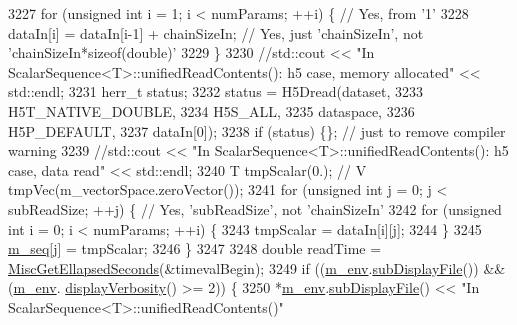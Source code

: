 \begin{DoxyCode}
3227               \textcolor{keywordflow}{for} (\textcolor{keywordtype}{unsigned} \textcolor{keywordtype}{int} i = 1; i < numParams; ++i) \{ \textcolor{comment}{// Yes, from '1'}
3228                 dataIn[i] = dataIn[i-1] + chainSizeIn; \textcolor{comment}{// Yes, just 'chainSizeIn', not
       'chainSizeIn*sizeof(double)'}
3229               \}
3230               \textcolor{comment}{//std::cout << "In ScalarSequence<T>::unifiedReadContents(): h5 case, memory allocated" <<
       std::endl;}
3231               herr\_t status;
3232               status = H5Dread(dataset,
3233                                H5T\_NATIVE\_DOUBLE,
3234                                H5S\_ALL,
3235                                dataspace,
3236                                H5P\_DEFAULT,
3237                                dataIn[0]);
3238               \textcolor{keywordflow}{if} (status) \{\}; \textcolor{comment}{// just to remove compiler warning}
3239               \textcolor{comment}{//std::cout << "In ScalarSequence<T>::unifiedReadContents(): h5 case, data read" <<
       std::endl;}
3240               T tmpScalar(0.); \textcolor{comment}{// V tmpVec(m\_vectorSpace.zeroVector());}
3241               \textcolor{keywordflow}{for} (\textcolor{keywordtype}{unsigned} \textcolor{keywordtype}{int} j = 0; j < subReadSize; ++j) \{ \textcolor{comment}{// Yes, 'subReadSize', not 'chainSizeIn'}
3242                 \textcolor{keywordflow}{for} (\textcolor{keywordtype}{unsigned} \textcolor{keywordtype}{int} i = 0; i < numParams; ++i) \{
3243                   tmpScalar = dataIn[i][j];
3244                 \}
3245                 \hyperlink{class_q_u_e_s_o_1_1_scalar_sequence_ae616036fd2e62fb69df167814545e893}{m\_seq}[j] = tmpScalar;
3246               \}
3247 
3248               \textcolor{keywordtype}{double} readTime = \hyperlink{namespace_q_u_e_s_o_a424bc33f2e6e287fd468408d14b772ee}{MiscGetEllapsedSeconds}(&timevalBegin);
3249               \textcolor{keywordflow}{if} ((\hyperlink{class_q_u_e_s_o_1_1_scalar_sequence_a71618cd6351b29361b437af68447a4c8}{m\_env}.\hyperlink{class_q_u_e_s_o_1_1_base_environment_a8a0064746ae8dddfece4229b9ad374d6}{subDisplayFile}()) && (\hyperlink{class_q_u_e_s_o_1_1_scalar_sequence_a71618cd6351b29361b437af68447a4c8}{m\_env}.
      \hyperlink{class_q_u_e_s_o_1_1_base_environment_a1fe5f244fc0316a0ab3e37463f108b96}{displayVerbosity}() >= 2)) \{
3250                 *\hyperlink{class_q_u_e_s_o_1_1_scalar_sequence_a71618cd6351b29361b437af68447a4c8}{m\_env}.\hyperlink{class_q_u_e_s_o_1_1_base_environment_a8a0064746ae8dddfece4229b9ad374d6}{subDisplayFile}() << \textcolor{stringliteral}{"In ScalarSequence<T>::unifiedReadContents()"}

\end{DoxyCode}

